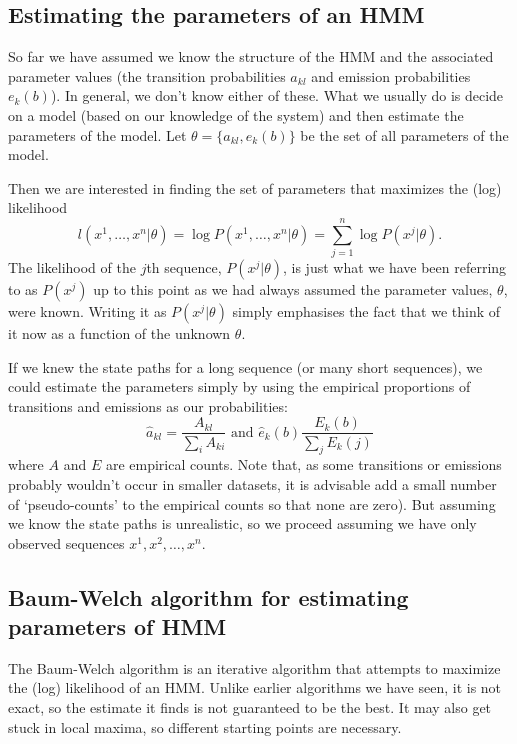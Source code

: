 \documentclass[11pt]{article}
\begin{document}
\subsection{Estimating the parameters of an HMM}

So far we have assumed we know the structure of the HMM and the associated parameter values (the transition probabilities $a_{kl}$ and emission probabilities $e_k(b)$).  In general, we don't know either of these.  What we usually do is decide on a model (based on our knowledge of the system) and then estimate the parameters of the model.  Let $\theta = \{ a_{kl}, e_k(b)\}$ be the set of all parameters of the model.

Then we are interested in finding the set of parameters that maximizes the (log) likelihood
\[ l(x^1,\ldots,x^n| \theta) = \log P(x^1,\ldots,x^n |\theta) = \sum_{j=1}^n \log P(x^j |\theta). \]
The likelihood of the $j$th sequence,  $ P(x^j |\theta)$, is just what we have been referring to as $P(x^j)$ up to this point as we had always assumed the parameter values, $\theta$, were known.   Writing it as $ P(x^j |\theta)$ simply emphasises the fact that we think of it now as a function of the unknown $\theta$.

If we knew the state paths for a long sequence (or many short sequences), we could estimate the parameters simply by using the empirical proportions of transitions and emissions as our probabilities:
\[\hat a_{kl} = \frac{A_{kl}}{\sum_i A_{ki}} \mbox{ and } \hat e_k(b)\frac{E_k(b)}{\sum_j E_k(j)} \]
where $A$ and $E$ are empirical counts.  Note that, as some transitions or emissions probably wouldn't occur in smaller datasets, it is advisable add a small number of `pseudo-counts' to the empirical counts so that none are zero).  But assuming we know the state paths is unrealistic, so we proceed assuming we have only observed sequences $x^1,x^2,\ldots, x^n $.



\subsection{Baum-Welch algorithm for estimating parameters of HMM}

The Baum-Welch algorithm is an iterative algorithm that attempts to  maximize the (log) likelihood of an HMM.  Unlike earlier algorithms we have seen, it is not exact, so the estimate it finds is not guaranteed to be the best.  It may also get stuck in local maxima, so different starting points are necessary.
\end{document}
